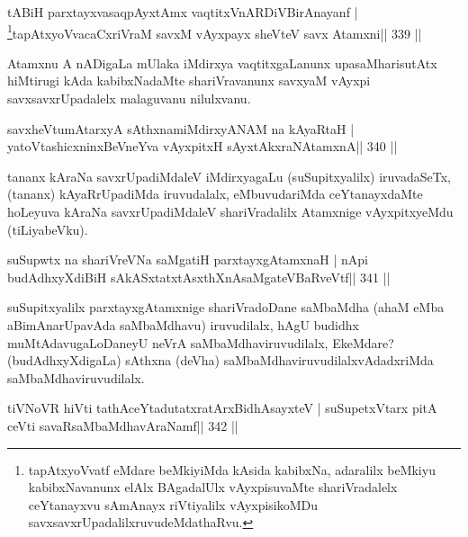 \begin{shl}
tABiH parxtayxvasaqpAyx\s\s tAmx vaqtitxVnARDiVBirAnayanf |
\footnote{tapAtxyoVvatf eMdare beMkiyiMda kAsida kabibxNa, 
adaralilx beMkiyu kabibxNavanunx elAlx BAgadalUlx vAyxpisuvaMte 
shariVradalelx ceYtanayxvu sAmAnayx riVtiyalilx vAyxpisikoMDu 
savxsavxrUpadalilxruvudeMdathaRvu.}tapAtxyoVvacaCxriVraM savxM vAyxpayx sheVteV savx Atamxni\hfill || 339 ||
\end{shl}

\begin{artha}
Atamxnu A nADigaLa mUlaka iMdirxya vaqtitxgaLanunx upasaMharisutAtx  hiMtirugi kAda kabibxNadaMte shariVravanunx savxyaM vAyxpi savxsavxrUpadalelx malaguvanu nilulxvanu.
\end{artha}


\begin{shl}
savxheVtumAtarxyA sAthxnamiMdirxyANAM na kAyaRtaH |
yatoV\s tashicxninxBeVneYva vAyxpitxH sAyxtAkxraNAtamxnA\hfill || 340 ||
\end{shl}

\begin{artha}
tananx kAraNa savxrUpadiMdaleV iMdirxyagaLu (suSupitxyalilx)  iruvadaSeTx, (tananx) kAyaRrUpadiMda iruvudalalx, eMbuvudariMda ceYtanayxdaMte hoLeyuva kAraNa savxrUpadiMdaleV shariVradalilx Atamxnige vAyxpitxyeMdu (tiLiyabeVku).
\end{artha}


\begin{shl}
suSupwtx na shariVreVNa saMgatiH parxtayxgAtamxnaH |
nApi budAdhxyXdiBiH sAkASxtatxtAsxthXnAsaMgateVBaRveVtf\hfill || 341 ||
\end{shl}

\begin{artha}
suSupitxyalilx parxtayxgAtamxnige shariVradoDane saMbaMdha (ahaM eMba  aBimAnarUpavAda saMbaMdhavu) iruvudilalx, hAgU budidhx  muMtAdavugaLoDaneyU neVrA saMbaMdhaviruvudilalx, EkeMdare? (budAdhxyXdigaLa) sAthxna (deVha) saMbaMdhaviruvudilalxvAdadxriMda saMbaMdhaviruvudilalx.
\end{artha}


\begin{shl}
tiVNoVR hiVti tathAceYtadutatxratArxBidhAsayxteV |
suSupetxV\s tarx pitA ceVti savaRsaMbaMdhavAraNamf\hfill || 342 ||
\end{shl}

